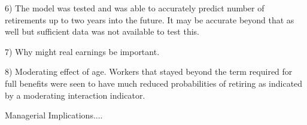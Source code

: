 \documentclass[12pt,letterpaper]{article}
\begin{document}
6) The model was tested and was able to accurately predict number of retirements up to two years into the future.  It may be accurate beyond that as well but sufficient data was not available to test this.

7) Why might real earnings be important.

8) Moderating effect of age.  Workers that stayed beyond the term required for full benefits were seen to have much reduced probabilities of retiring as indicated by a moderating interaction indicator.


Managerial Implications....

	
\end{document}
